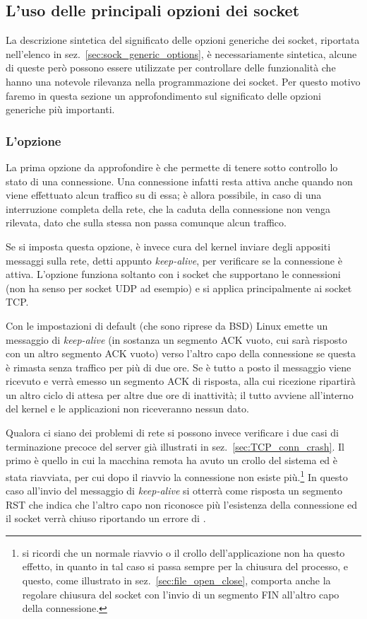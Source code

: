 \subsection{L'uso delle principali opzioni dei socket}
\label{sec:sock_options_main}

La descrizione sintetica del significato delle opzioni generiche dei socket,
riportata nell'elenco in sez.~\ref{sec:sock_generic_options}, è
necessariamente sintetica, alcune di queste però possono essere utilizzate
per controllare delle funzionalità che hanno una notevole rilevanza nella
programmazione dei socket.  Per questo motivo faremo in questa sezione un
approfondimento sul significato delle opzioni generiche più importanti.


\subsubsection{L'opzione }

La prima opzione da approfondire è  che permette di
tenere sotto controllo lo stato di una connessione. Una connessione infatti
resta attiva anche quando non viene effettuato alcun traffico su di essa; è
allora possibile, in caso di una interruzione completa della rete, che la
caduta della connessione non venga rilevata, dato che sulla stessa non passa
comunque alcun traffico.

Se si imposta questa opzione, è invece cura del kernel inviare degli appositi
messaggi sulla rete, detti appunto \textit{keep-alive}, per verificare se la
connessione è attiva.  L'opzione funziona soltanto con i socket che supportano
le connessioni (non ha senso per socket UDP ad esempio) e si applica
principalmente ai socket TCP.

Con le impostazioni di default (che sono riprese da BSD) Linux emette un
messaggio di \textit{keep-alive} (in sostanza un segmento ACK vuoto, cui sarà
risposto con un altro segmento ACK vuoto) verso l'altro capo della connessione
se questa è rimasta senza traffico per più di due ore.  Se è tutto a posto il
messaggio viene ricevuto e verrà emesso un segmento ACK di risposta, alla cui
ricezione ripartirà un altro ciclo di attesa per altre due ore di inattività;
il tutto avviene all'interno del kernel e le applicazioni non riceveranno
nessun dato.

Qualora ci siano dei problemi di rete si possono invece verificare i due casi
di terminazione precoce del server già illustrati in
sez.~\ref{sec:TCP_conn_crash}. Il primo è quello in cui la macchina remota ha
avuto un crollo del sistema ed è stata riavviata, per cui dopo il riavvio la
connessione non esiste più.\footnote{si ricordi che un normale riavvio o il
  crollo dell'applicazione non ha questo effetto, in quanto in tal caso si
  passa sempre per la chiusura del processo, e questo, come illustrato in
  sez.~\ref{sec:file_open_close}, comporta anche la regolare chiusura del
  socket con l'invio di un segmento FIN all'altro capo della connessione.} In
questo caso all'invio del messaggio di \textit{keep-alive} si otterrà come
risposta un segmento RST che indica che l'altro capo non riconosce più
l'esistenza della connessione ed il socket verrà chiuso riportando un errore
di .

